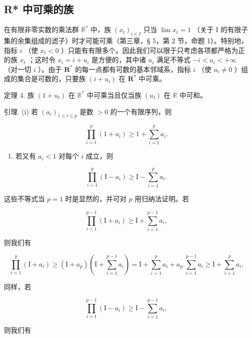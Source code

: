 \subsection{R* 中可乘的族}

在有限非零实数的乘法群 \(\mathbb{R}^*\) 中，族 \((x_{t})_{i\in I}\) 只当 \(\lim x_{t} = 1\) （关于 I 的有限子集的余集组成的滤子）时才可能可乘（第三章，§ 5，第 2 节，命题 1）。特别地，指标 \(i\) （使 \(x_{t} < 0\) ）只能有有限多个。因此我们可以限于只考虑各项都严格为正的族 \(x_{t}\) ；这时令 \(x_{i} = i + u_{i}\) 是方便的，其中诸 \(u_{i}\) 满足不等式 \(-i < u_{i} < +\infty\) （对一切 \(i\) ）。由于 \(\mathbf{R}^*\) 的每一点都有可数的基本邻域系，指标 \(i\) （使 \(u_{i} \neq 0\) ）组成的集合是可数的，只要族 \((i + u_{i})\) 在 \(\mathbf{R}^*\) 中可乘。

定理 4. 族 \((1 + u_{t})\) 在 \(\mathbb{R}^*\) 中可乘当且仅当族 \((u_{t})\) 在 \(\mathbb{R}\) 中可和。

引理. (i) 若 \((a_{i})_{1\leqslant i\leqslant p}\) 是数 \(>0\) 的一个有限序列，则

\[
\prod_ {i = 1} ^ {p} \left(1 + a _ {i}\right) \geqslant 1 + \sum_ {i = 1} ^ {p} a _ {i}.\tag{2}
\]

\begin{enumerate}
\def\labelenumi{(\roman{enumi})}
\setcounter{enumi}{1}
\tightlist
\item
  若又有 \(a_i < 1\) 对每个 \(i\) 成立，则
\end{enumerate}

\[
\prod_ {i = 1} ^ {p} \left(\mathrm{I} - a _ {i}\right) \geqslant \mathrm{I} - \sum_ {i = 1} ^ {p} a _ {i}.\tag{3}
\]

这些不等式当 \(p = 1\) 时是显然的，并可对 \(p\) 用归纳法证明。若

\[
\prod_ {i = 1} ^ {p - 1} \left(\mathrm{I} + a _ {i}\right) \geqslant \mathrm{I} + \sum_ {i = 1} ^ {p - 1} a _ {i},
\]

则我们有

\[
\prod_ {i = 1} ^ {p} \left(\mathrm{I} + a _ {i}\right) \geqslant \left(\mathrm{I} + a _ {p}\right) \left(\mathrm{I} + \sum_ {i = 1} ^ {p - 1} a _ {i}\right) = \mathrm{I} + \sum_ {i = 1} ^ {p} a _ {i} + a _ {p}. \sum_ {i = 1} ^ {p - 1} a _ {i} \geqslant \mathrm{I} + \sum_ {i = 1} ^ {p} a _ {i}.
\]

同样，若

\[
\prod_ {i = 1} ^ {p - 1} \left(\mathrm{I} - a _ {i}\right) \geqslant \mathrm{I} - \sum_ {i = 1} ^ {p - 1} a _ {i},
\]

则我们有

